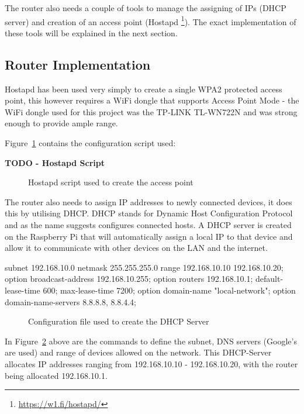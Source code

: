 The router also needs a couple of tools to manage the assigning of IPs (DHCP server) and creation of an access point (Hostapd \footnote{\url{https://w1.fi/hostapd/}}). The exact implementation of these tools will be explained in the next section.


\subsection{Router Implementation}
Hostapd has been used very simply to create a single WPA2 protected access point, this however requires a WiFi dongle that supports Access Point Mode - the WiFi dongle used for this project was the TP-LINK TL-WN722N and was strong enough to provide ample range.

Figure~\ref{ref:Hostapd} contains the configuration script used:

\begin{center}
	{\bf  TODO - Hostapd Script}
	\begin{figure}[h]
		\caption{Hostapd script used to create the access point}
		\label{ref:Hostapd}
	\end{figure}
\end{center}


The router also needs to assign IP addresses to newly connected devices, it does this by utilising DHCP. DHCP stands for Dynamic Host Configuration Protocol and as the name suggests configures connected hosts. A DHCP server is created on the Raspberry Pi that will automatically assign a local IP to that device and allow it to communicate with other devices on the LAN and the internet.

\begin{center}
\begin{Scripts}{}
subnet 192.168.10.0 netmask 255.255.255.0 {
	range 192.168.10.10 192.168.10.20;
 	option broadcast-address 192.168.10.255;
 	option routers 192.168.10.1;
 	default-lease-time 600;
 	max-lease-time 7200;
 	option domain-name "local-network";
 	option domain-name-servers 8.8.8.8, 8.8.4.4;
}
\end{Scripts}
\begin{figure}[h]
	\caption{Configuration file used to create the DHCP Server}
	\label{ref:dhcp-server}
\end{figure}
\end{center}

In Figure~\ref{ref:dhcp-server} above are the commands to define the subnet, DNS servers (Google's are used) and range of devices allowed on the network. This DHCP-Server allocates IP addresses ranging from 192.168.10.10 - 192.168.10.20, with the router being allocated 192.168.10.1.

